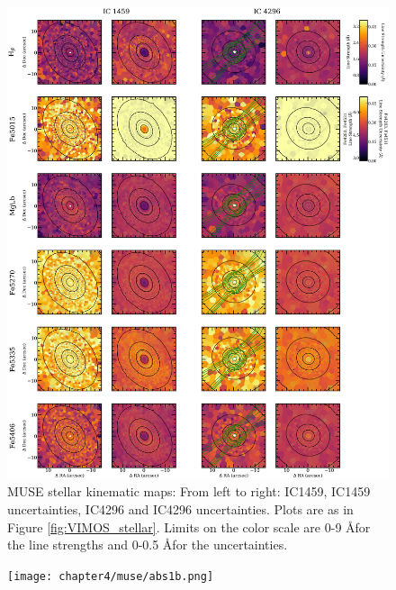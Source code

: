 		\begin{figure}
			\centering
			\includegraphics[height=0.94\textheight]{chapter4/muse/abs1.png}
			\caption[MUSE absorption line strength maps]{MUSE stellar kinematic maps: From left to right: IC1459, IC1459 uncertainties, IC4296 and IC4296 uncertainties. Plots are as in Figure \ref{fig:VIMOS_stellar}. Limits on the color scale are 0-9 \AA  for the line strengths and 0-0.5 \AA  for the uncertainties.}
			\label{fig:MUSE_absorption}
		\end{figure}
		\begin{figure}
			\centering
			\texttt{[image: chapter4/muse/abs1b.png]}
		\end{figure}
